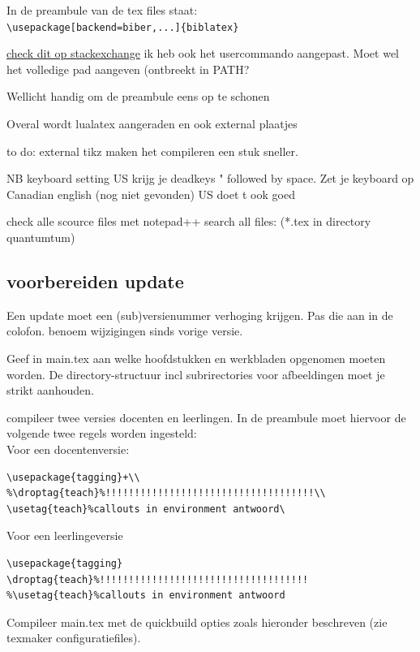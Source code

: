 \documentclass[../../main.tex]{subfiles}
\begin{document}
In de preambule van de tex files staat:\\
\verb+\usepackage[backend=biber,...]{biblatex}+

\href{https://tex.stackexchange.com/questions/154751/biblatex-with-biber-configuring-my-editor-to-avoid-undefined-citations/154788#154788}{check dit op stackexchange}
ik heb ook het usercommando aangepast. Moet wel het volledige pad aangeven (ontbreekt in PATH?

Wellicht handig om de preambule eens op te schonen

Overal wordt lualatex aangeraden en ook external plaatjes

to do: external tikz maken het compileren een stuk sneller.

NB keyboard setting US krijg je deadkeys " followed by space. Zet je keyboard op Canadian english (nog niet gevonden) US doet t ook goed


check alle scource files met notepad++
search all files:
(*.tex in directory quantumtum)

\subsection*{voorbereiden update}
Een update moet een (sub)versienummer verhoging krijgen. Pas die aan in de colofon.
benoem wijzigingen sinds vorige versie.

Geef in main.tex aan welke hoofdstukken en werkbladen opgenomen moeten worden. De directory-structuur incl subrirectories voor afbeeldingen moet je strikt aanhouden.

compileer twee versies docenten en leerlingen. In de preambule moet hiervoor de volgende twee regels worden ingesteld:\\


Voor een docentenversie:\\
\begin{verbatim}
\usepackage{tagging}+\\
%\droptag{teach}%!!!!!!!!!!!!!!!!!!!!!!!!!!!!!!!!!!!!\\
\usetag{teach}%callouts in environment antwoord\
\end{verbatim}

Voor een leerlingeversie
\begin{verbatim}
\usepackage{tagging}
\droptag{teach}%!!!!!!!!!!!!!!!!!!!!!!!!!!!!!!!!!!!!
%\usetag{teach}%callouts in environment antwoord
\end{verbatim}


Compileer main.tex met de quickbuild opties zoals hieronder beschreven (zie texmaker configuratiefiles).
\end{document}
